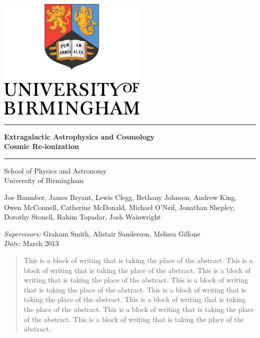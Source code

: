 \begin{titlepage}
  \begin{center}
    \vspace*{\fill}

    \centering
    \includegraphics[scale=1.0]{Logo.pdf}
    \vfill

    \hrule
    {\LARGE\bf Extragalactic Astrophysics and Cosmology\\Cosmic Re-ionization \\[0.4cm]}
    \hrule

    \vfill
    \large
    School of Physics and Astronomy\\
    University of Birmingham

    \vfill
    { Joe Baumber, 
    	James Bryant, 
    	Lewis Clegg, 
    	Bethany Johnson, 
    	Andrew King, 
    	Owen McConnell, 
    	Catherine McDonald, 
    	Michael O'Neil, 
    	Jonathan Shepley, 
    	Dorothy Stonell, 
    	Rahim Topadar, 
    	Josh Wainwright\\}
    \vfill

    \vfill
    \textit{Supervisors:} Graham Smith, Alistair Sanderson, Melissa Gillone \\
    		\vfill
    \textit{Date:} March 2013
    \vfill

    \begin{abstract}
    	This is a block of writing that is taking the place of the abstract. This is a block of writing that is taking the place of the abstract. This is a block of writing that is taking the place of the abstract. This is a block of writing that is taking the place of the abstract. This is a block of writing that is taking the place of the abstract. This is a block of writing that is taking the place of the abstract. This is a block of writing that is taking the place of the abstract. This is a block of writing that is taking the place of the abstract.
    \end{abstract}  	
   
    
    \vfill

  \end{center}
\end{titlepage}



